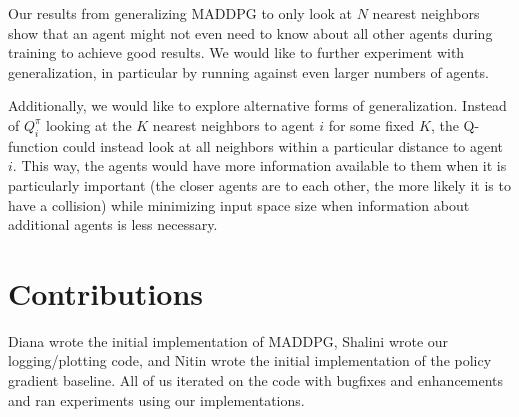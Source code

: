 \documentclass{article}
\begin{document}
Our results from generalizing MADDPG to only look at $N$ nearest neighbors show that an agent might not even need to know about all other agents during training to achieve good results. We would like to further experiment with generalization, in particular by running against even larger numbers of agents.

Additionally, we would like to explore alternative forms of generalization. Instead of $Q^\pi_i$ looking at the $K$ nearest neighbors to agent $i$ for some fixed $K$, the Q-function could instead look at all neighbors within a particular distance to agent $i$. This way, the agents would have more information available to them when it is particularly important (the closer agents are to each other, the more likely it is to have a collision) while minimizing input space size when information about additional agents is less necessary.

\section*{Contributions}
Diana wrote the initial implementation of MADDPG, Shalini wrote our logging/plotting code, and Nitin wrote the initial implementation of the policy gradient baseline. All of us iterated on the code with bugfixes and enhancements and ran experiments using our implementations.



\end{document}
